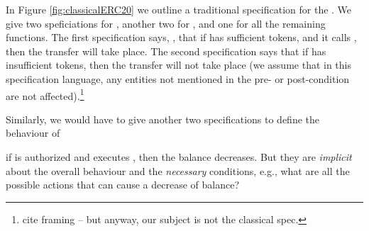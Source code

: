 In Figure \ref{fig:classicalERC20} we outline a traditional specification for the .
We give two speficiations for , another two for , and one for all 
the remaining functions. The  first specification says, \eg, that if  
  has sufficient tokens, and it calls , then the transfer will take place.  
The second specification says that  if  has insufficient tokens, then 
the transfer will not take place (we assume that in this
specification language, any entities not mentioned in the pre- or post-condition 
are not affected).\footnote{cite framing -- but anyway, our subject is not the classical spec.}
 
 Similarly, we would have to give another two specifications to define the behaviour of 

if  is authorized and executes , then   the balance decreases. 
But they are {\em implicit} about the overall behaviour and the   {\em necessary} conditions,
e.g., what are all the possible actions that can cause a decrease of balance?


